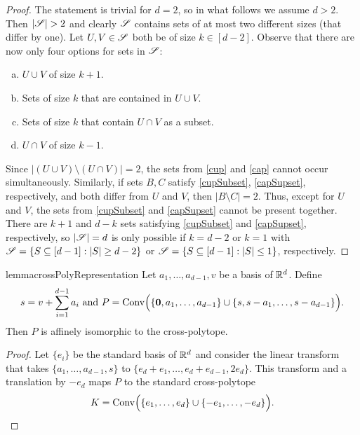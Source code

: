 \begin{proof}
    The  statement is trivial for $d=2$, so in what follows we assume $d>2$. Then $|\sss|>2$ and clearly ${\mathscr{S}}$ contains sets of at most two different sizes (that differ by one). Let $U, V \in {\mathscr{S}}$ both be of size $k\in [d-2]$. Observe that there are now only four options for sets in ${\mathscr{S}}$:
    \begin{enumerate}[(a)]
        \item $U \cup V$ of size $k+1$. \label{cup}
        \item Sets of size $k$ that are contained in $U \cup V$. \label{cupSubset}
        \item Sets of size $k$ that contain $U\cap V$ as a subset. \label{capSupset}
        \item $U \cap V$ of size $k-1$. \label{cap}
    \end{enumerate}
Since $|(U \cup V)\setminus (U \cap V)|=2$, the sets from \ref{cup} and \ref{cap} cannot occur simultaneously. Similarly, if sets $B, C$ satisfy \ref{cupSubset}, \ref{capSupset}, respectively, and both differ from $U$ and $V$, then $|B\setminus C|=2$. Thus, except for $U$ and $V$, the sets from \ref{cupSubset} and \ref{capSupset} cannot be present together. There are $k+1$ and $d-k$ sets satisfying \ref{cupSubset} and \ref{capSupset}, respectively, so $|{\mathscr{S}}|=d$ is only possible if $k=d-2$ or $k=1$ with ${\mathscr{S}} = \{S\subseteq[d-1]: |S| \geq d-2\}$ or ${\mathscr{S}} = \{S\subseteq[d-1]: |S| \leq 1\}$, respectively. 
\end{proof}

\begin{restatable}[]{lemma}{crossPolyRepresentation}\label{crossPolyRepr}
    Let ${a_1, \ldots, a_{d-1}, v}$ be a basis of ${\mathbb{R}}^d$. Define
    \[
        s=v+\sum_{i=1}^{d-1}a_i\text{ and }P=\operatorname{Conv}\Bigl(\{\mathbf{0}, a_1, \ldots, a_{d-1}\}\cup\{s, s-a_1, \ldots, s-a_{d-1}\}\Bigr).
    \]
    Then $P$ is affinely isomorphic to the cross-polytope.
\end{restatable}

\begin{proof}
    Let $\{e_i\}$ be the standard basis of ${\mathbb{R}}^d$ and consider the linear transform that takes $\{a_1, \ldots, a_{d-1}, s\}$ to $\{e_d + e_1, \ldots, e_d + e_{d-1}, 2e_d\}$. This transform and a translation by $-e_d$ maps $P$ to the standard cross-polytope 
    \[
        K = \operatorname{Conv}\Bigl(\{e_1, \ldots, e_d\}\cup\{-e_1, \ldots, -e_d\}\Bigr).
    \]
\end{proof}

